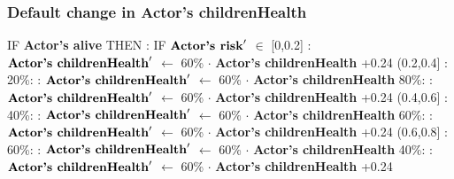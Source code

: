 \documentclass{article}%
\begin{document}
\subsubsection{Default change in Actor's childrenHealth}%
\label{ssubsec:Default change in Actor's childrenHealth}%
\begin{flushleft}%
IF %
\textbf{Actor's alive}%
\linebreak%
\hspace*{2em}%
THEN %
: %
IF %
$\mbox{\textbf{Actor's risk}} '$%
$\in$%
\linebreak%
\hspace*{4em}%
{[}0,0.2{]}%
: %
$\mbox{\textbf{Actor's childrenHealth}} '$%
$\leftarrow$%
60\%%
$\cdot$%
\textbf{Actor's childrenHealth}%
+0.24%
\linebreak%
\hspace*{4em}%
(0.2,0.4{]}%
: %
\linebreak%
\hspace*{6em}%
20\%:%
: %
$\mbox{\textbf{Actor's childrenHealth}} '$%
$\leftarrow$%
60\%%
$\cdot$%
\textbf{Actor's childrenHealth}%
\linebreak%
\hspace*{6em}%
80\%:%
: %
$\mbox{\textbf{Actor's childrenHealth}} '$%
$\leftarrow$%
60\%%
$\cdot$%
\textbf{Actor's childrenHealth}%
+0.24%
\linebreak%
\hspace*{4em}%
(0.4,0.6{]}%
: %
\linebreak%
\hspace*{6em}%
40\%:%
: %
$\mbox{\textbf{Actor's childrenHealth}} '$%
$\leftarrow$%
60\%%
$\cdot$%
\textbf{Actor's childrenHealth}%
\linebreak%
\hspace*{6em}%
60\%:%
: %
$\mbox{\textbf{Actor's childrenHealth}} '$%
$\leftarrow$%
60\%%
$\cdot$%
\textbf{Actor's childrenHealth}%
+0.24%
\linebreak%
\hspace*{4em}%
(0.6,0.8{]}%
: %
\linebreak%
\hspace*{6em}%
60\%:%
: %
$\mbox{\textbf{Actor's childrenHealth}} '$%
$\leftarrow$%
60\%%
$\cdot$%
\textbf{Actor's childrenHealth}%
\linebreak%
\hspace*{6em}%
40\%:%
: %
$\mbox{\textbf{Actor's childrenHealth}} '$%
$\leftarrow$%
60\%%
$\cdot$%
\textbf{Actor's childrenHealth}%
+0.24%
\linebreak%
\hspace*{4em}%

\end{flushleft}
\end{document}
